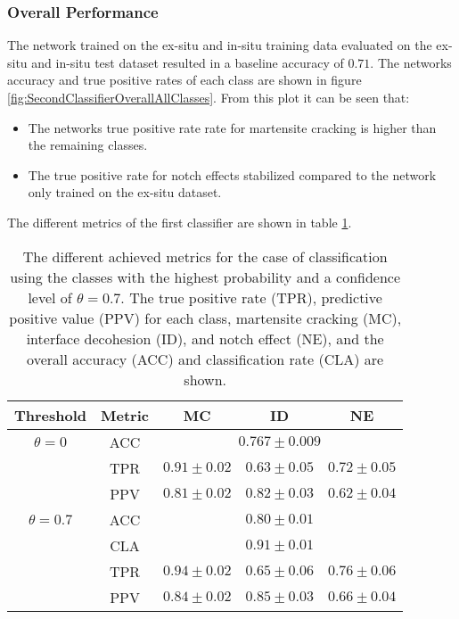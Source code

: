 
\subsubsection{Overall Performance}
The network trained on the ex-situ and in-situ training data evaluated on the ex-situ and in-situ test dataset resulted in a baseline accuracy of $0.71$. The networks accuracy and true positive rates of each class are shown in figure \ref{fig:SecondClassifierOverallAllClasses}. From this plot it can be seen that:
\begin{itemize}
\item The networks true positive rate rate for martensite cracking is higher than the remaining classes.
\item The true positive rate for notch effects stabilized compared to the network only trained on the ex-situ dataset. 
\end{itemize}
The different metrics of the first classifier are shown in table \ref{tab:SecondClassifierMetrics}.

\begin{table}[H]
 \begin{center}
  \begin{tabular}{@{} *5c @{}} \toprule[2pt]
   Threshold & Metric &  MC & ID & NE \\ \midrule
   $\theta=0$ & ACC & \multicolumn{3}{c}{$0.767\pm0.009$} \\
   &TPR  & $0.91\pm 0.02$ & $0.63 \pm 0.05 $ & $0.72\pm 0.05$ \\
   &PPV  & $0.81\pm 0.02$ & $0.82\pm 0.03$ & $0.62\pm 0.04$ \\ \midrule
   $\theta=0.7$ & ACC & \multicolumn{3}{c}{ $0.80\pm0.01$} \\
   &CLA  & \multicolumn{3}{c}{ $0.91\pm 0.01$} \\ 
   &TPR  & $0.94\pm 0.02$ & $0.65 \pm 0.06$ & $0.76\pm 0.06$  \\
   &PPV  & $0.84 \pm 0.02$ & $0.85 \pm 0.03$ & $0.66 \pm 0.04$  \\   \bottomrule[2pt]
  \end{tabular}
 \end{center}
 \caption{The different achieved metrics for the case of classification using the classes with the highest probability and a confidence level of $\theta =0.7$. The true positive rate (TPR), predictive positive value (PPV) for each class, martensite cracking (MC), interface decohesion (ID), and notch effect (NE), and the overall accuracy (ACC) and classification rate (CLA) are shown.}
   \label{tab:SecondClassifierMetrics}
\end{table}

